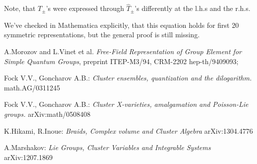 \documentclass{article}
\newcommand {\?}{\textit{???}}
\newcommand{\hT}[0]{\hat{T}}
\begin{document}
Note, that $T_\pm$'s were expressed through $\hT_\pm$'s differently at the l.h.s and the r.h.s.

We've checked in Mathematica explicitly, that this equation holds for first 20 symmetric representations,
but the general proof is still missing.

\begin{thebibliography}{12}

A.Morozov and L.Vinet et al. {\it Free-Field Representation of Group Element for Simple Quantum Groups},
preprint ITEP-M3/94, CRM-2202 hep-th/9409093;

Fock V.V., Goncharov A.B.: {\it Cluster ensembles, quantization and the dilogarithm.}
math.AG/0311245

Fock V.V., Goncharov A.B.: {\it Cluster X-varieties, amalgamation and Poisson-Lie groups.}
arXiv:math/0508408

K.Hikami, R.Inoue: {\it Braids, Complex volume and Cluster Algebra}
arXiv:1304.4776

A.Marshakov: {\it Lie Groups, Cluster Variables and Integrable Systems}
arXiv:1207.1869

\end{thebibliography}
\end{document}
